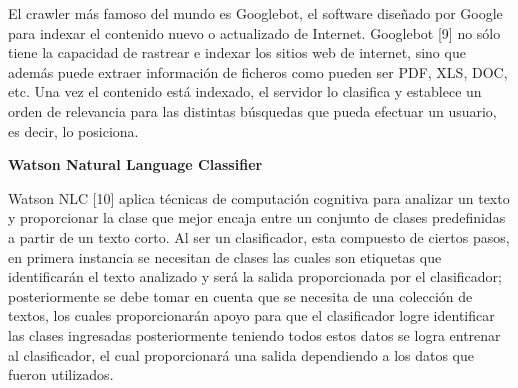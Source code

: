 El crawler más famoso del mundo es Googlebot, el software diseñado por Google para indexar el contenido nuevo o actualizado de Internet.
Googlebot [9] no sólo tiene la capacidad de rastrear e indexar los sitios web de internet, sino que además puede extraer información de ficheros como pueden ser PDF, XLS, DOC, etc.
Una vez el contenido está indexado, el servidor lo clasifica y establece un orden de relevancia para las distintas búsquedas que pueda efectuar un usuario, es decir, lo posiciona.\\



\begin{large}
	 \textbf{Watson Natural Language Classifier}\\
\end{large}

Watson NLC [10] aplica técnicas de computación cognitiva para analizar un texto y proporcionar la clase que mejor encaja entre un conjunto de clases predefinidas a partir de un texto corto.
Al ser un clasificador, esta compuesto de ciertos pasos, en primera instancia se necesitan de clases las cuales son etiquetas que identificarán el texto analizado y será la salida proporcionada por el clasificador; posteriormente se debe tomar en cuenta que se necesita de una colección de textos, los cuales proporcionarán apoyo para que el clasificador logre identificar las clases ingresadas posteriormente teniendo todos estos datos se logra entrenar al clasificador, el cual proporcionará una salida dependiendo a los datos que fueron utilizados.


